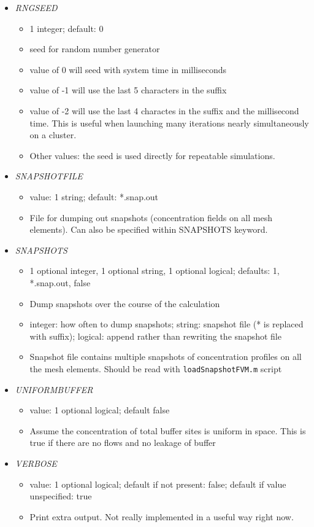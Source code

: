 \documentclass[12pt]{article}
\begin{document}
\begin{itemize}
%
\item {\it RNGSEED}
  \begin{itemize}
    \item 1 integer; default: 0
    \item seed for random number generator
    \item value of 0 will seed with system time in milliseconds
    \item value of -1 will use the last 5 characters in the suffix
    \item value of -2 will use the last 4 charactes in the suffix and the millisecond time. This is useful when launching many iterations nearly simultaneously on a cluster.
    \item Other values: the seed is used directly for repeatable simulations. 
  \end{itemize}
%
\item {\it SNAPSHOTFILE}
    \begin{itemize}
      \item  value: 1 string; default: *.snap.out
      \item File for dumping out snapshots (concentration fields on all mesh elements). Can also be specified within SNAPSHOTS keyword.
    \end{itemize}
%
\item {\it SNAPSHOTS}
\begin{itemize}
	\item 1 optional integer, 1 optional string, 1 optional logical; defaults: 1, *.snap.out, false
	\item Dump snapshots over the course of the calculation
	\item integer: how often to dump snapshots; string: snapshot file (* is replaced with suffix); logical: append rather than rewriting the snapshot file
	\item Snapshot file contains multiple snapshots of concentration profiles on all the mesh elements. Should be read with \verb=loadSnapshotFVM.m= script
\end{itemize}
%
\item {\it UNIFORMBUFFER}
\begin{itemize}
	\item  value: 1 optional logical; default false
	\item Assume the concentration of total buffer sites is uniform in space. This is true if there are no flows and  no leakage of buffer
\end{itemize}
%
\item {\it VERBOSE}
        \begin{itemize}
          \item  value: 1 optional logical; default if not present: false; default if value unspecified: true
          \item Print extra output. Not really implemented in a useful way right now.
        \end{itemize}

\end{itemize}

%
%
\end{document}
